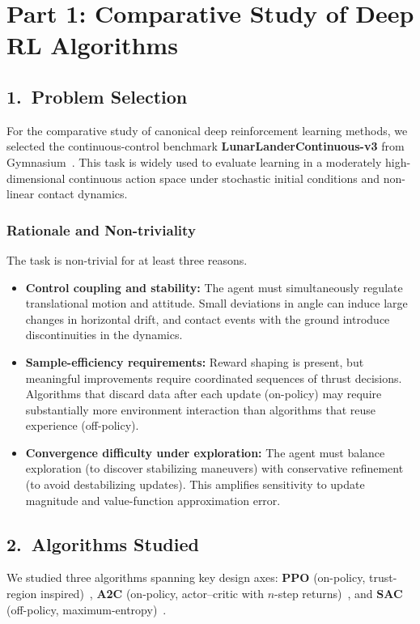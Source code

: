 \documentclass[a4paper,11pt,notitlepage]{report}
\begin{document}
\tableofcontents
\newpage

\chapter{Part 1: Comparative Study of Deep RL Algorithms}

\section{1.\ Problem Selection}
For the comparative study of canonical deep reinforcement learning methods, we selected the continuous-control benchmark \textbf{LunarLanderContinuous-v3} from Gymnasium~\cite{gymnasium}. This task is widely used to evaluate learning in a moderately high-dimensional continuous action space under stochastic initial conditions and non-linear contact dynamics.

\subsection{Rationale and Non-triviality}
The task is non-trivial for at least three reasons.
\begin{itemize}
    \item \textbf{Control coupling and stability:} The agent must simultaneously regulate translational motion and attitude. Small deviations in angle can induce large changes in horizontal drift, and contact events with the ground introduce discontinuities in the dynamics.
    \item \textbf{Sample-efficiency requirements:} Reward shaping is present, but meaningful improvements require coordinated sequences of thrust decisions. Algorithms that discard data after each update (on-policy) may require substantially more environment interaction than algorithms that reuse experience (off-policy).
    \item \textbf{Convergence difficulty under exploration:} The agent must balance exploration (to discover stabilizing maneuvers) with conservative refinement (to avoid destabilizing updates). This amplifies sensitivity to update magnitude and value-function approximation error.
\end{itemize}

\section{2.\ Algorithms Studied}
We studied three algorithms spanning key design axes: \textbf{PPO} (on-policy, trust-region inspired)\allowbreak~\cite{schulman2017ppo}, \textbf{A2C} (on-policy, actor--critic with $n$-step returns)\allowbreak~\cite{mnih2016a3c}, and \textbf{SAC} (off-policy, maximum-entropy)\allowbreak~\cite{haarnoja2018sac}.
\end{document}
